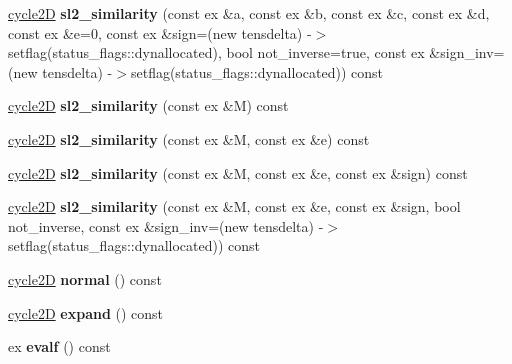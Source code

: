 \begin{DoxyCompactItemize}
\mbox{\hyperlink{class_moeb_inv_1_1cycle2_d}{cycle2D}} {\bfseries sl2\+\_\+similarity} (const ex \&a, const ex \&b, const ex \&c, const ex \&d, const ex \&e=0, const ex \&sign=(new tensdelta) -\/$>$setflag(status\+\_\+flags\+::dynallocated), bool not\+\_\+inverse=true, const ex \&sign\+\_\+inv=(new tensdelta) -\/$>$setflag(status\+\_\+flags\+::dynallocated)) const
\item 
\mbox{\label{class_moeb_inv_1_1cycle2_d_a0bf048ab4e38bf5e97768e8b487133a7}} 
\mbox{\hyperlink{class_moeb_inv_1_1cycle2_d}{cycle2D}} {\bfseries sl2\+\_\+similarity} (const ex \&M) const
\item 
\mbox{\label{class_moeb_inv_1_1cycle2_d_aa8f61f0344737af159983fc2f826296f}} 
\mbox{\hyperlink{class_moeb_inv_1_1cycle2_d}{cycle2D}} {\bfseries sl2\+\_\+similarity} (const ex \&M, const ex \&e) const
\item 
\mbox{\label{class_moeb_inv_1_1cycle2_d_a0f2e64f2a6242ad4ad70165311c00c52}} 
\mbox{\hyperlink{class_moeb_inv_1_1cycle2_d}{cycle2D}} {\bfseries sl2\+\_\+similarity} (const ex \&M, const ex \&e, const ex \&sign) const
\item 
\mbox{\label{class_moeb_inv_1_1cycle2_d_aac7c5d4c1f9e566cfb310dda8c7bba10}} 
\mbox{\hyperlink{class_moeb_inv_1_1cycle2_d}{cycle2D}} {\bfseries sl2\+\_\+similarity} (const ex \&M, const ex \&e, const ex \&sign, bool not\+\_\+inverse, const ex \&sign\+\_\+inv=(new tensdelta) -\/$>$setflag(status\+\_\+flags\+::dynallocated)) const
\item 
\mbox{\label{class_moeb_inv_1_1cycle2_d_abd85b44a39704e5459eab9620d5d6ec5}} 
\mbox{\hyperlink{class_moeb_inv_1_1cycle2_d}{cycle2D}} {\bfseries normal} () const
\item 
\mbox{\label{class_moeb_inv_1_1cycle2_d_a6f8a9b46040a85dd89ef41af946311c4}} 
\mbox{\hyperlink{class_moeb_inv_1_1cycle2_d}{cycle2D}} {\bfseries expand} () const
\item 
\mbox{\label{class_moeb_inv_1_1cycle2_d_aa14f443442b57392d563119e52efc7c2}} 
ex {\bfseries evalf} () const
\item 

\end{DoxyCompactItemize}
